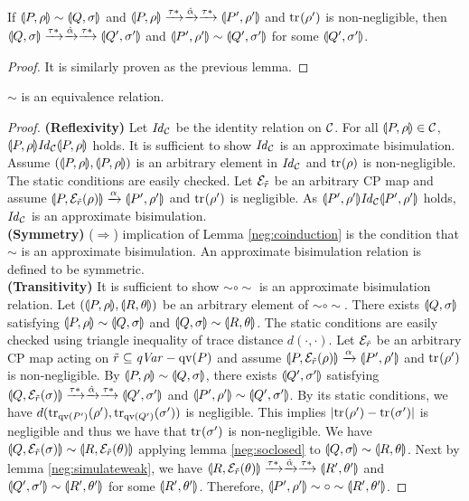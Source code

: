 \begin{lem}
\label{neg:simulateweak}
If $\con{P}{\rho} \sim \con{Q}{\sigma}$ and 
$\con{P}{\rho} \weak{\hat \alpha} \con{P'}{\rho'}$ and
 $\tr{}{\rho'}$ is non-negligible, then
$\con{Q}{\sigma} \weak{\hat \alpha}
 \con{Q'}{\sigma'}$ and $\con{P'}{\rho'} \sim \con{Q'}{\sigma'}$
 for some $\con{Q'}{\sigma'}$.
\end{lem}

\begin{proof}
 It is similarly proven as the previous lemma.
\end{proof}

\begin{lem}
\label{neg:equivalence}
 $\sim$ is an equivalence relation.
\end{lem}
\begin{proof}
 {\bf (Reflexivity)} 
 Let $\mathit{Id}_\C$ be the identity relation on $\C$.
 For all $\con{P}{\rho} \in \C$, 
 $\con{P}{\rho}\mathit{Id}_\C \con{P}{\rho}$ holds.
 It is sufficient to show
 $\mathit{Id}_\C$ is an approximate bisimulation. 
 Assume $(\con{P}{\rho},
 \con{P}{\rho})$ is an arbitrary element in $\mathit{Id}_\C$ and
 $\tr{}{\rho}$ is non-negligible. The static conditions are 
 easily checked.
 Let $\E_{\tilde r}$ be an arbitrary CP map and assume
 $\con{P}{\E_{\tilde r}(\rho)} \xrightarrow{\alpha}
 \con{P'}{\rho'}$ and $\tr{}{\rho'}$ is negligible. As
 $\con{P'}{\rho'}\mathit{Id}_\C \con{P'}{\rho'}$ holds,
 $\mathit{Id}_\C$
 is an approximate bisimulation. \\
 {\bf (Symmetry)} 
 ($\Rightarrow$) implication of
 Lemma \ref{neg:coinduction} is the condition that $\sim$ is 
 an approximate bisimulation.
 An approximate bisimulation relation
 is defined to be symmetric. 
 \\
 {\bf (Transitivity)} It is sufficient to show $\sim \circ \sim$
 is an approximate bisimulation relation. Let $(\con{P}{\rho},
 \con{R}{\theta})$ be an arbitrary element of $\sim \circ
 \sim$. There exists $\con{Q}{\sigma}$ satisfying
 $\con{P}{\rho} \sim \con{Q}{\sigma}$ and $\con{Q}{\sigma}
 \sim {\con{R}{\theta}}$. 
 The static conditions are easily checked using
 triangle inequality of trace distance $d(\cdot, \cdot)$.
 Let $\E_{\tilde r}$ be an arbitrary
 CP map acting on $\tilde r \subseteq \sfqv - \qv{P}$ and
 assume $\con{P}{\E_{\tilde r}(\rho)} \xrightarrow{\alpha}
 \con{P'}{\rho'}$ and $\tr{}{\rho'}$ is non-negligible.
 By $\con{P}{\rho} \sim \con{Q}{\sigma}$, there exists
 $\con{Q'}{\sigma'}$ satisfying $\con{Q}{\E_{\tilde r}(\sigma)} 
 \weak{\hat \alpha} \con{Q'}{\sigma'}$ and $\con{P'}{\rho'} \sim
 \con{Q'}{\sigma'}$. By its static conditions, we have
 $d(\tr{\qv{P'}}{\rho'}, \tr{\qv{Q'}}{\sigma'})$ is negligible.
 This implies $|\tr{}{\rho'} - \tr{}{\sigma'}|$ is 
 negligible and thus we have
 that $\tr{}{\sigma'}$ is non-negligible.
 We have $\con{Q}{\E_{\tilde r}(\sigma)}
 \sim \con{R}{\E_{\tilde r}(\theta)}$ applying lemma
 \ref{neg:soclosed} to $\con{Q}{\sigma}
 \sim {\con{R}{\theta}}$. Next by lemma
 \ref{neg:simulateweak}, we have $\con{R}{\E_{\tilde r}(\theta)}
 \weak{\hat \alpha} \con{R'}{\theta'}$ and $\con{Q'}{\sigma'}
 \sim \con{R'}{\theta'}$ for some $\con{R'}{\theta'}$. 
 Therefore, $\con{P'}{\rho'}\sim \circ \sim \con{R'}{\theta'}$.
\end{proof}
